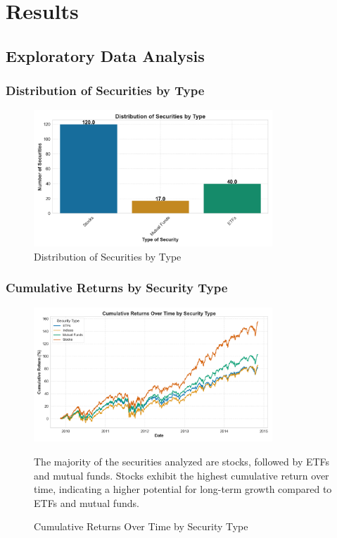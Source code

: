 \section{Results}
\subsection{Exploratory Data Analysis}

\subsubsection{Distribution of Securities by Type}

\begin{figure}[!htbp]
    \centering
    \includegraphics[width=0.8\textwidth]{../Figures/histogram_security_count.png}
    \caption{Distribution of Securities by Type}
    \label{fig:distribution_of_securities}
\end{figure}

\subsubsection{Cumulative Returns by Security Type}

\begin{figure}[!htbp]
    \centering
    \includegraphics[width=0.8\textwidth]{../Figures/cumulative_returns_by_type.png}
    \caption{Cumulative Returns Over Time by Security Type}
    \label{fig:cumulative_returns_by_type}
    \subcaption The majority of the securities analyzed are stocks, followed by ETFs and mutual funds. Stocks exhibit the highest cumulative return over time, indicating a higher potential for long-term growth compared to ETFs and mutual funds.
\end{figure}

